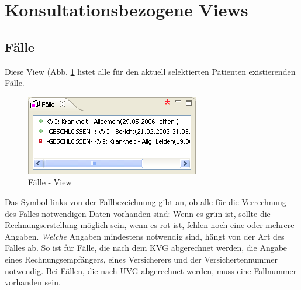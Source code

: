 

\section{Konsultationsbezogene Views}

\subsection{Fälle}
Diese View (Abb. \ref{fig:faelle} listet alle für den aktuell selektierten
Patienten existierenden Fälle. 
\begin{figure}[htp]
\begin{center}
  \includegraphics{images/faelleview}
  \caption{Fälle - View}
  \label{fig:faelle}
\end{center}
\end{figure}

Das Symbol links von der Fallbezeichnung gibt an, ob alle für die Verrechnung
des Falles notwendigen Daten vorhanden sind: Wenn es grün ist, sollte die
Rechnungserstellung möglich sein, wenn es rot ist, fehlen noch eine oder mehrere
Angaben. \textit{Welche} Angaben mindestens notwendig sind, hängt von der Art
des Falles ab. So ist für Fälle, die nach dem KVG abgerechnet werden, die Angabe
eines Rechnungsempfängers, eines Versicherers und der Versichertennummer
notwendig. Bei Fällen, die nach UVG abgerechnet werden, muss eine Fallnummer
vorhanden sein.

